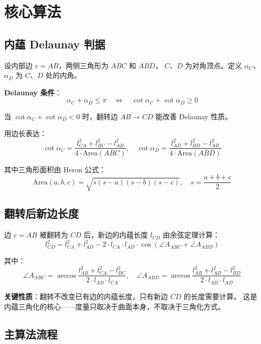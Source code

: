 \documentclass[11pt,a4paper]{article}
\begin{document}
\section{核心算法}

\subsection{内蕴 Delaunay 判据}

设内部边 $e = AB$，两侧三角形为 $ABC$ 和 $ABD$，
$C$、$D$ 为对角顶点。定义 $\alpha_C$、$\alpha_D$ 为 $C$、$D$ 处的内角。

\textbf{Delaunay 条件}：
\[
  \alpha_C + \alpha_D \leq \pi
  \quad \Longleftrightarrow \quad
  \cot\alpha_C + \cot\alpha_D \geq 0
\]

当 $\cot\alpha_C + \cot\alpha_D < 0$ 时，翻转边 $AB \to CD$ 能改善
Delaunay 性质。

用边长表达：
\[
  \cot\alpha_C = \frac{l_{CA}^2 + l_{BC}^2 - l_{AB}^2}{4 \cdot \text{Area}(ABC)},
  \quad
  \cot\alpha_D = \frac{l_{AD}^2 + l_{BD}^2 - l_{AB}^2}{4 \cdot \text{Area}(ABD)}
\]

其中三角形面积由 Heron 公式：
\[
  \text{Area}(a,b,c) = \sqrt{s(s-a)(s-b)(s-c)},
  \quad s = \frac{a+b+c}{2}
\]

\subsection{翻转后新边长度}

边 $e = AB$ 被翻转为 $CD$ 后，新边的内蕴长度 $l_{CD}$ 由余弦定理计算：
\[
  l_{CD}^2 = l_{CA}^2 + l_{AD}^2
  - 2 \cdot l_{CA} \cdot l_{AD} \cdot \cos\!\left(\angle A_{ABC} + \angle A_{ABD}\right)
\]

其中：
\[
  \angle A_{ABC} = \arccos\frac{l_{AB}^2 + l_{CA}^2 - l_{BC}^2}{2 \cdot l_{AB} \cdot l_{CA}},
  \quad
  \angle A_{ABD} = \arccos\frac{l_{AB}^2 + l_{AD}^2 - l_{BD}^2}{2 \cdot l_{AB} \cdot l_{AD}}
\]

\textbf{关键性质}：翻转不改变已有边的内蕴长度，只有新边 $CD$ 的长度需要计算。
这是内蕴三角化的核心——度量只取决于曲面本身，不取决于三角化方式。

\subsection{主算法流程}
\end{document}
